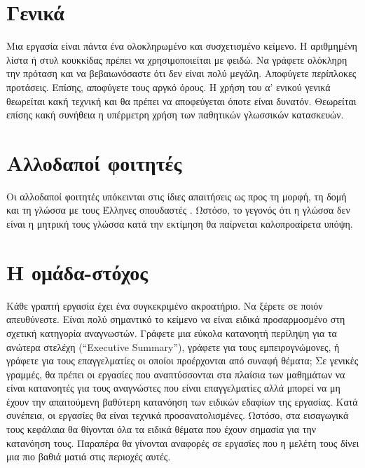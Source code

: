 \section{Γενικά}
Μια εργασία είναι πάντα ένα ολοκληρωμένο και συσχετισμένο κείμενο. Η αριθμημένη λίστα ή στυλ κουκκίδας πρέπει να χρησιμοποιείται με φειδώ. Να γράφετε ολόκληρη την πρόταση και να βεβαιωνόσαστε ότι δεν είναι πολύ μεγάλη. Αποφύγετε περίπλοκες προτάσεις. Επίσης, αποφύγετε τους αργκό όρους. Η χρήση του α' ενικού  γενικά θεωρείται κακή τεχνική και θα πρέπει να αποφεύγεται όποτε είναι δυνατόν. Θεωρείται επίσης κακή συνήθεια η υπέρμετρη χρήση  των παθητικών γλωσσικών κατασκευών.
\section{Αλλοδαποί φοιτητές}
Οι αλλοδαποί φοιτητές υπόκεινται στις ίδιες απαιτήσεις ως προς τη μορφή, τη δομή και τη γλώσσα με τους Έλληνες σπουδαστές . Ωστόσο, το γεγονός ότι η γλώσσα δεν είναι η μητρική τους γλώσσα κατά την εκτίμηση θα παίρνεται καλοπροαίρετα υπόψη.
\section{Η ομάδα-στόχος}
Κάθε γραπτή εργασία έχει ένα συγκεκριμένο ακροατήριο. Να ξέρετε σε ποιόν απευθύνεστε. Είναι πολύ σημαντικό το κείμενο να είναι ειδικά προσαρμοσμένο στη σχετική κατηγορία αναγνωστών. Γράφετε μια εύκολα κατανοητή περίληψη για τα ανώτερα στελέχη (``Executive Summary''), γράφετε για τους εμπειρογνώμονες, ή γράφετε για τους επαγγελματίες οι οποίοι προέρχονται από συναφή θέματα;
Σε γενικές γραμμές, θα πρέπει οι εργασίες που αναπτύσσονται στα πλαίσια των μαθημάτων να είναι κατανοητές για τους αναγνώστες που είναι επαγγελματίες αλλά μπορεί να μη έχουν την απαιτούμενη βαθύτερη κατανόηση των ειδικών εδαφίων της εργασίας. Κατά συνέπεια, οι εργασίες θα είναι τεχνικά προσανατολισμένες. Ωστόσο, στα εισαγωγικά τους κεφάλαια  θα θίγονται όλα τα ειδικά θέματα που έχουν σημασία για την κατανόηση τους. Παραπέρα θα γίνονται αναφορές σε εργασίες που η μελέτη τους δίνει μια πιο βαθιά ματιά στις περιοχές αυτές.
